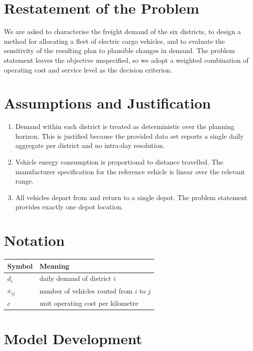 \documentclass[10pt]{article}
\begin{document}
\section{Restatement of the Problem}

We are asked to characterise the freight demand of the six districts, to design a
method for allocating a fleet of electric cargo vehicles, and to evaluate the
sensitivity of the resulting plan to plausible changes in demand. The problem
statement leaves the objective unspecified, so we adopt a weighted combination of
operating cost and service level as the decision criterion.

\section{Assumptions and Justification}

\begin{enumerate}
  \item Demand within each district is treated as deterministic over the planning
        horizon. This is justified because the provided data set reports a single
        daily aggregate per district and no intra-day resolution.
  \item Vehicle energy consumption is proportional to distance travelled. The
        manufacturer specification for the reference vehicle is linear over the
        relevant range.
  \item All vehicles depart from and return to a single depot. The problem
        statement provides exactly one depot location.
\end{enumerate}

\section{Notation}

\begin{tabular}{ll}
\toprule
Symbol & Meaning \\
\midrule
$d_i$ & daily demand of district $i$ \\
$x_{ij}$ & number of vehicles routed from $i$ to $j$ \\
$c$ & unit operating cost per kilometre \\
\bottomrule
\end{tabular}

\section{Model Development}
\end{document}
